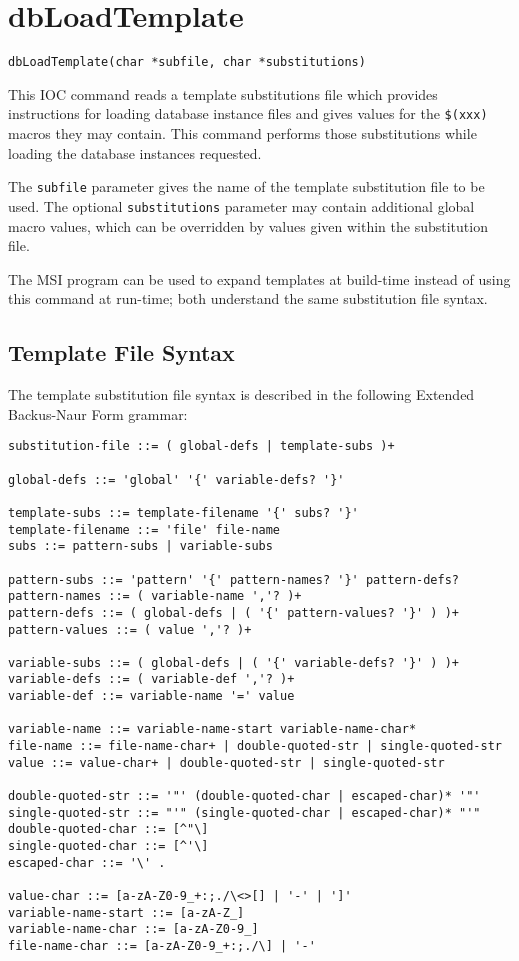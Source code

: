 \section{dbLoadTemplate}

\begin{verbatim}
dbLoadTemplate(char *subfile, char *substitutions)
\end{verbatim}

This IOC command reads a template substitutions file which provides instructions for loading database instance files and gives values for the \verb|$(xxx)| macros they may contain.
This command performs those substitutions while loading the database instances requested.

The \verb|subfile| parameter gives the name of the template substitution file to be used.
The optional \verb|substitutions| parameter may contain additional global macro values, which can be overridden by values given within the substitution file.

The MSI program can be used to expand templates at build-time instead of using this command at run-time; both understand the same substitution file syntax.

\subsection{Template File Syntax}

The template substitution file syntax is described in the following Extended Backus-Naur Form grammar:

\begin{verbatim}
substitution-file ::= ( global-defs | template-subs )+

global-defs ::= 'global' '{' variable-defs? '}'

template-subs ::= template-filename '{' subs? '}'
template-filename ::= 'file' file-name
subs ::= pattern-subs | variable-subs

pattern-subs ::= 'pattern' '{' pattern-names? '}' pattern-defs?
pattern-names ::= ( variable-name ','? )+
pattern-defs ::= ( global-defs | ( '{' pattern-values? '}' ) )+
pattern-values ::= ( value ','? )+

variable-subs ::= ( global-defs | ( '{' variable-defs? '}' ) )+
variable-defs ::= ( variable-def ','? )+
variable-def ::= variable-name '=' value

variable-name ::= variable-name-start variable-name-char*
file-name ::= file-name-char+ | double-quoted-str | single-quoted-str
value ::= value-char+ | double-quoted-str | single-quoted-str

double-quoted-str ::= '"' (double-quoted-char | escaped-char)* '"'
single-quoted-str ::= "'" (single-quoted-char | escaped-char)* "'"
double-quoted-char ::= [^"\]
single-quoted-char ::= [^'\]
escaped-char ::= '\' .

value-char ::= [a-zA-Z0-9_+:;./\<>[] | '-' | ']'
variable-name-start ::= [a-zA-Z_]
variable-name-char ::= [a-zA-Z0-9_]
file-name-char ::= [a-zA-Z0-9_+:;./\] | '-'
\end{verbatim}

